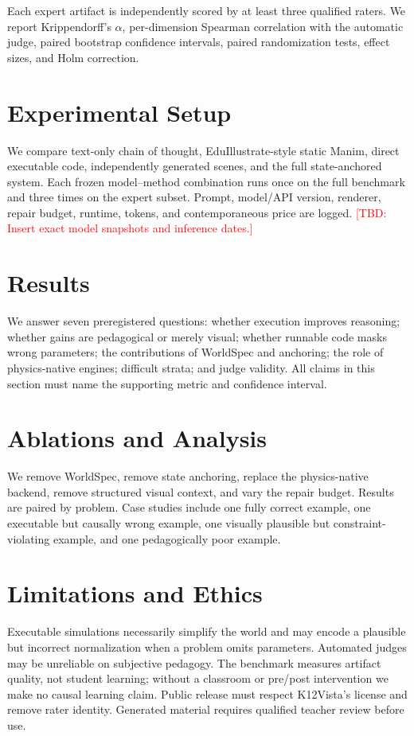 \documentclass[11pt]{article}
\newcommand{\tbd}[1]{\textcolor{red}{[TBD: #1]}}
\begin{document}
Each expert artifact is independently scored by at least three qualified raters. We report
Krippendorff's $\alpha$, per-dimension Spearman correlation with the automatic judge, paired
bootstrap confidence intervals, paired randomization tests, effect sizes, and Holm correction.

\section{Experimental Setup}
We compare text-only chain of thought, EduIllustrate-style static Manim, direct executable code,
independently generated scenes, and the full state-anchored system. Each frozen model--method
combination runs once on the full benchmark and three times on the expert subset. Prompt,
model/API version, renderer, repair budget, runtime, tokens, and contemporaneous price are logged.
\tbd{Insert exact model snapshots and inference dates.}

\section{Results}

We answer seven preregistered questions: whether execution improves reasoning; whether gains are
pedagogical or merely visual; whether runnable code masks wrong parameters; the contributions of
WorldSpec and anchoring; the role of physics-native engines; difficult strata; and judge validity.
All claims in this section must name the supporting metric and confidence interval.

\section{Ablations and Analysis}
We remove WorldSpec, remove state anchoring, replace the physics-native backend, remove structured
visual context, and vary the repair budget. Results are paired by problem. Case studies include
one fully correct example, one executable but causally wrong example, one visually plausible but
constraint-violating example, and one pedagogically poor example.

\section{Limitations and Ethics}
Executable simulations necessarily simplify the world and may encode a plausible but incorrect
normalization when a problem omits parameters. Automated judges may be unreliable on subjective
pedagogy. The benchmark measures artifact quality, not student learning; without a classroom or
pre/post intervention we make no causal learning claim. Public release must respect K12Vista's
license and remove rater identity. Generated material requires qualified teacher review before use.
\end{document}

